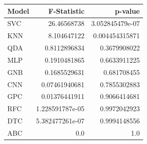 \begin{tabular}{lrr}
\toprule
Model & F-Statistic & p-value \\
\midrule
SVC & 26.46568738 & 3.052845479e-07 \\
KNN & 8.104647122 & 0.004454315871 \\
QDA & 0.8112896834 & 0.3679908022 \\
MLP & 0.1910481865 & 0.6633911225 \\
GNB & 0.1685529631 & 0.681708455 \\
CNN & 0.07461940681 & 0.7855302883 \\
GPC & 0.01376441911 & 0.9066414681 \\
RFC & 1.228591787e-05 & 0.9972042923 \\
DTC & 5.382477261e-07 & 0.9994148556 \\
ABC & 0.0 & 1.0 \\
\bottomrule
\end{tabular}
